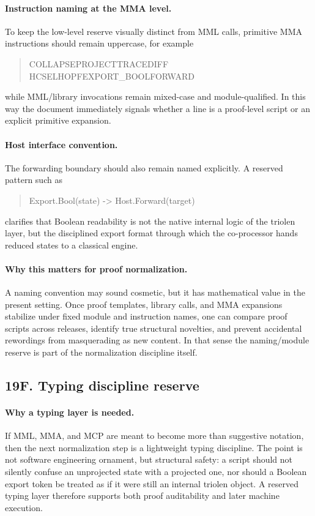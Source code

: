 \paragraph{Instruction naming at the MMA level.}
To keep the low-level reserve visually distinct from MML calls, primitive MMA instructions should remain uppercase, for example
\begin{quote}
\ttfamily
COLLAPSE\quad PROJECT\quad TRACE\quad DIFF\\
HCSEL\quad HOPF\quad EXPORT\_BOOL\quad FORWARD
\end{quote}
while MML/library invocations remain mixed-case and module-qualified. In this way the document immediately signals whether a line is a proof-level script or an explicit primitive expansion.

\paragraph{Host interface convention.}
The forwarding boundary should also remain named explicitly. A reserved pattern such as
\begin{quote}
\ttfamily
Export.Bool(state) -> Host.Forward(target)
\end{quote}
clarifies that Boolean readability is not the native internal logic of the triolen layer, but the disciplined export format through which the co-processor hands reduced states to a classical engine.

\paragraph{Why this matters for proof normalization.}
A naming convention may sound cosmetic, but it has mathematical value in the present setting. Once proof templates, library calls, and MMA expansions stabilize under fixed module and instruction names, one can compare proof scripts across releases, identify true structural novelties, and prevent accidental rewordings from masquerading as new content. In that sense the naming/module reserve is part of the normalization discipline itself.


\subsection*{19F. Typing discipline reserve}

\paragraph{Why a typing layer is needed.}
If MML, MMA, and MCP are meant to become more than suggestive notation, then the next normalization step is a lightweight typing discipline. The point is not software engineering ornament, but structural safety: a script should not silently confuse an unprojected state with a projected one, nor should a Boolean export token be treated as if it were still an internal triolen object. A reserved typing layer therefore supports both proof auditability and later machine execution.


